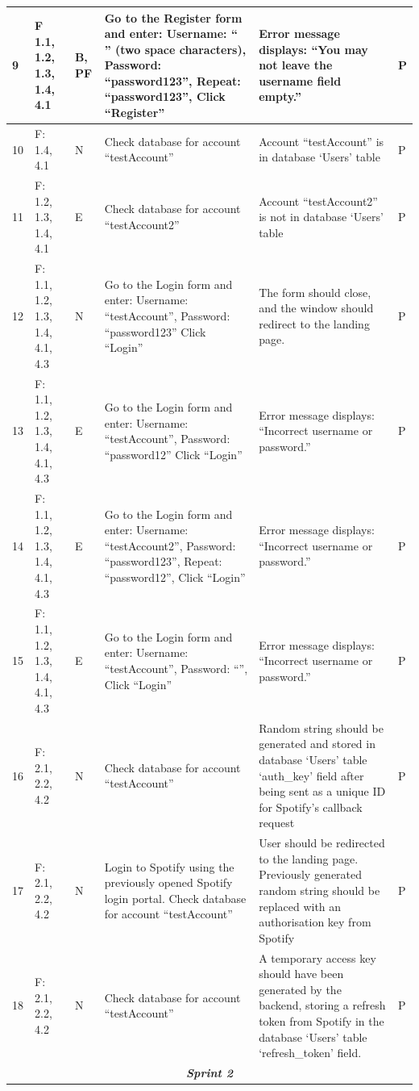 \documentclass[10pt, notitlepage]{report}
\begin{document}
\begin{longtable}{| p{0.4cm} | p{1.8cm} | p{0.7cm} | p{6.5cm} | p{4.5cm} | p{0.5cm}|}
9&F 1.1, 1.2, 1.3, 1.4, 4.1&B, PF &Go to the Register form and enter: Username: “  ” (two space characters), Password: “password123”, Repeat: “password123”, Click “Register”&Error message displays: “You may not leave the username field empty.”&P\\ \hline
10&F: 1.4, 4.1&N&Check database for account “testAccount”&Account “testAccount” is in database ‘Users’ table&P\\ \hline
11&F: 1.2, 1.3, 1.4, 4.1&E&Check database for account “testAccount2”&Account “testAccount2” is not in database ‘Users’ table&P\\ \hline
12&F: 1.1, 1.2, 1.3, 1.4, 4.1, 4.3&N&Go to the Login form and enter: Username: “testAccount”, Password: “password123” Click “Login”&The form should close, and the window should redirect to the landing page.&P\\ \hline
13&F: 1.1, 1.2, 1.3, 1.4, 4.1, 4.3&E&Go to the Login form and enter: Username: “testAccount”, Password: “password12” Click “Login”&Error message displays: “Incorrect username or password.”&P\\ \hline
14&F: 1.1, 1.2, 1.3, 1.4, 4.1, 4.3&E&Go to the Login form and enter: Username: “testAccount2”, Password: “password123”, Repeat: “password12”, Click “Login”&Error message displays: “Incorrect username or password.”&P\\ \hline
15&F: 1.1, 1.2, 1.3, 1.4, 4.1, 4.3&E&Go to the Login form and enter: Username: “testAccount”, Password: “”, Click “Login”&Error message displays: “Incorrect username or password.”&P\\ \hline
16&F: 2.1, 2.2, 4.2&N&Check database for account “testAccount” & Random string should be generated and stored in database ‘Users’ table ‘auth\_key’ field after being sent as a unique ID for Spotify’s callback request&P\\ \hline
17&F: 2.1, 2.2, 4.2&N&Login to Spotify using the previously opened Spotify login portal. Check database for account “testAccount”&User should be redirected to the landing page. Previously generated random string should be replaced with an authorisation key from Spotify&P\\ \hline
18&F: 2.1, 2.2, 4.2&N&Check database for account “testAccount”&A temporary access key should have been generated by the backend, storing a refresh token from Spotify in the database ‘Users’ table ‘refresh\_token’ field.&P\\ \hline

\multicolumn{6}{|c|}{\textit{\textbf{Sprint 2}}} \\
\hline


\end{longtable}
\end{document}
